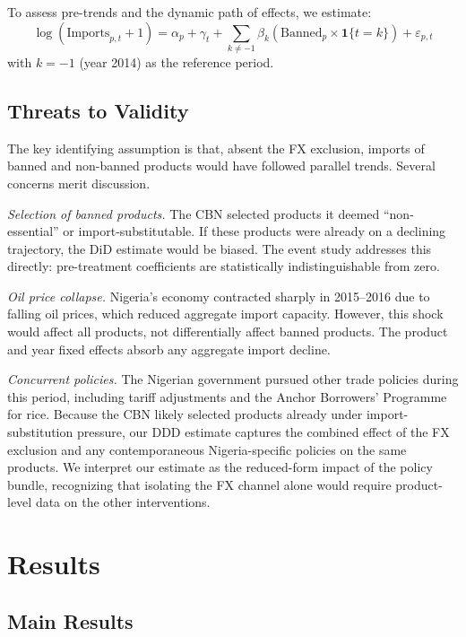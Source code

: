 \documentclass[12pt]{article}
\begin{document}
To assess pre-trends and the dynamic path of effects, we estimate:
\begin{equation}
\log(\text{Imports}_{p,t} + 1) = \alpha_p + \gamma_t + \sum_{k \neq -1} \beta_k (\text{Banned}_p \times \mathbf{1}\{t = k\}) + \varepsilon_{p,t}
\label{eq:es}
\end{equation}
with $k = -1$ (year 2014) as the reference period.

\subsection{Threats to Validity}

The key identifying assumption is that, absent the FX exclusion, imports of banned and non-banned products would have followed parallel trends. Several concerns merit discussion.

\textit{Selection of banned products.} The CBN selected products it deemed ``non-essential'' or import-substitutable. If these products were already on a declining trajectory, the DiD estimate would be biased. The event study addresses this directly: pre-treatment coefficients are statistically indistinguishable from zero.

\textit{Oil price collapse.} Nigeria's economy contracted sharply in 2015--2016 due to falling oil prices, which reduced aggregate import capacity. However, this shock would affect all products, not differentially affect banned products. The product and year fixed effects absorb any aggregate import decline.

\textit{Concurrent policies.} The Nigerian government pursued other trade policies during this period, including tariff adjustments and the Anchor Borrowers' Programme for rice. Because the CBN likely selected products already under import-substitution pressure, our DDD estimate captures the combined effect of the FX exclusion and any contemporaneous Nigeria-specific policies on the same products. We interpret our estimate as the reduced-form impact of the policy bundle, recognizing that isolating the FX channel alone would require product-level data on the other interventions.

\section{Results}

\subsection{Main Results}
\end{document}

